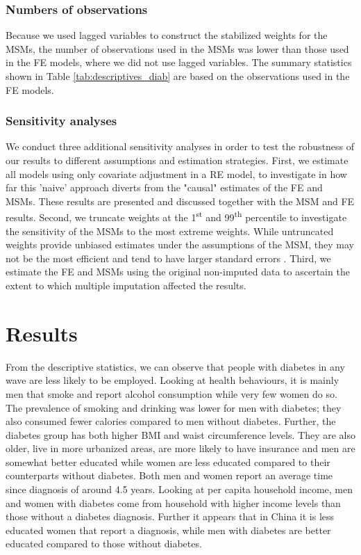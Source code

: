 \subsubsection*{Numbers of observations}

Because we used lagged variables to construct the stabilized weights for the \acp{MSM}, the number of observations used in the \acp{MSM} was lower than those used in the \ac{FE} models, where we did not use lagged variables. The summary statistics shown in Table \ref{tab:descriptives_diab} are based on the observations used in the \ac{FE} models.

\subsubsection*{Sensitivity analyses}

We conduct three additional sensitivity analyses in order to test the robustness of our results to different assumptions and estimation strategies.
First, we estimate all models using only covariate adjustment in a \ac{RE} model, to investigate in how far this 'naive' approach diverts from the "causal" estimates of the \ac{FE} and \acp{MSM}. These results are presented and discussed together with the \ac{MSM} and \ac{FE} results. Second, we truncate weights at the 1\textsuperscript{st} and 99\textsuperscript{th} percentile to investigate the sensitivity of the \acp{MSM} to the most extreme weights. While untruncated weights provide unbiased estimates under the assumptions of the \ac{MSM}, they may not be the most efficient and tend to have larger standard errors \parencite{Cole2008}. Third, we estimate the \ac{FE} and \acp{MSM} using the original non-imputed data to ascertain the extent to which multiple imputation affected the results.

\section{\label{sec:Results5}Results}

From the descriptive statistics, we can observe that people with diabetes in any wave are less likely to be employed. Looking at health behaviours, it is mainly men that smoke and report alcohol consumption while very few women do so. The prevalence of smoking and drinking was lower for men with diabetes; they also consumed fewer calories compared to men without diabetes. Further, the diabetes group has both higher \ac{BMI} and waist circumference levels. They are also older, live in more urbanized areas, are more likely to have insurance and men are somewhat better educated while women are less educated compared to their counterparts without diabetes. Both men and women report an average time since diagnosis of around 4.5 years. Looking at per capita household income, men and women with diabetes come from household with higher income levels than those without a diabetes diagnosis. Further it appears that in China it is less educated women that report a diagnosis, while men with diabetes are better educated compared to those without diabetes.

